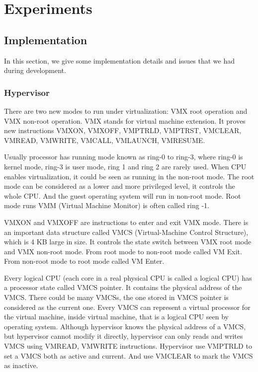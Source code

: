 
\section{Experiments}

\subsection{Implementation}
\label{sec:implementation}

In this section, we give some implementation details and issues that we had during development.

\subsubsection{Hypervisor}


There are two new modes to run under virtualization: VMX root operation and VMX non-root operation. VMX stands for virtual machine extension. It proves new instructions VMXON, VMXOFF, VMPTRLD, VMPTRST, VMCLEAR, VMREAD, VMWRITE, VMCALL, VMLAUNCH, VMRESUME.

Usually processor has running mode known as ring-0 to ring-3, where ring-0 is kernel mode, ring-3 is user mode, ring 1 and ring 2 are rarely used. When CPU enables virtualization, it could be seen as running in the non-root mode. The root mode can be considered as a lower and more privileged level, it controls the whole CPU. And the guest operating system will run in non-root mode. Root mode runs VMM (Virtual Machine Monitor) is often called ring -1.

VMXON and VMXOFF are instructions to enter and exit VMX mode. There is an important data structure called VMCS (Virtual-Machine Control Structure), which is 4 KB large in size. It controls the state switch between VMX root mode and VMX non-root mode. From root mode to non-root mode called VM Exit. From non-root mode to root mode called VM Enter.

Every logical CPU (each core in a real physical CPU is called a logical CPU) has a processor state called VMCS pointer. It contains the physical address of the VMCS. There could be many VMCSs, the one stored in VMCS pointer is considered as the current one. Every VMCS can represent a virtual processor for the virtual machine, inside virtual machine, that is a logical CPU seen by operating system. Although hypervisor knows the physical address of a VMCS, but hypervisor cannot modify it directly, hypervisor can only reads and writes VMCS using VMREAD, VMWRITE instructions. Hypervisor use VMPTRLD to set a VMCS both as active and current. And use VMCLEAR to mark the VMCS as inactive.


